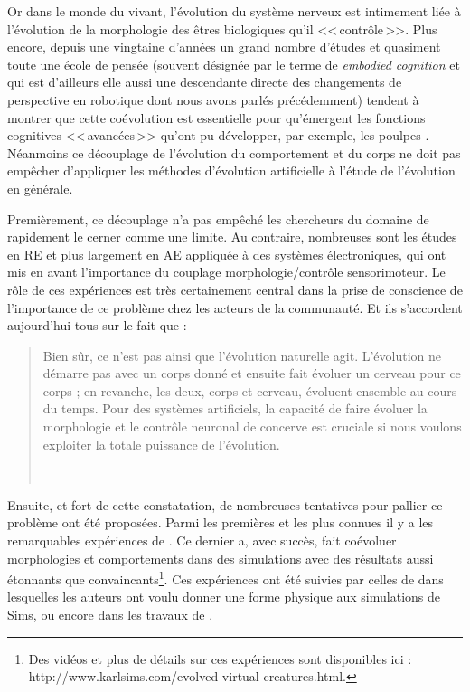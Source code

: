Or dans le monde du vivant, l'évolution du système nerveux est intimement liée à l'évolution de la morphologie des êtres biologiques qu'il <<\,contrôle\,>>. Plus encore, depuis une vingtaine d'années un grand nombre d'études et quasiment toute une école de pensée (souvent désignée par le terme de \emph{embodied cognition} et qui est d'ailleurs elle aussi une descendante directe des changements de perspective en robotique dont nous avons parlés précédemment) tendent à montrer que cette coévolution est essentielle pour qu'émergent les fonctions cognitives <<\,avancées\,>> qu'ont pu développer, par exemple, les poulpes \citep{pfeifer2006howthebodyshapesthewaywethink}. Néanmoins ce découplage de l'évolution du comportement et du corps ne doit pas empêcher d'appliquer les méthodes d'évolution artificielle à l'étude de l'évolution en générale.

Premièrement, ce découplage n'a pas empêché les chercheurs du domaine de rapidement le cerner comme une limite. Au contraire, nombreuses sont les études en RE et plus largement en AE appliquée à des systèmes électroniques, qui ont mis en avant l'importance du couplage morphologie/contrôle sensorimoteur. Le rôle de ces expériences est très certainement central dans la prise de conscience de l'importance de ce problème chez les acteurs de la communauté. Et ils s'accordent aujourd'hui tous sur le fait que :

\begin{quotation}

   Bien sûr, ce n'est pas ainsi que l'évolution naturelle agit. L'évolution ne démarre pas avec un corps donné et ensuite fait évoluer un cerveau pour ce corps ; en revanche, les deux, corps et cerveau, évoluent ensemble au cours du temps. Pour des systèmes artificiels, la capacité de faire évoluer la morphologie et le contrôle neuronal de concerve est cruciale si nous voulons exploiter la totale puissance de l'évolution.

   \\\citep[p. 193]{pfeifer2006howthebodyshapesthewaywethink}

\end{quotation}

Ensuite, et fort de cette constatation, de nombreuses tentatives pour pallier ce problème ont été proposées. Parmi les premières et les plus connues il y a les remarquables expériences de \cite{sims1994evolving3dmorphologyandbehaviorbycompetition}. Ce dernier a, avec succès, fait coévoluer morphologies et comportements dans des simulations avec des résultats aussi étonnants que convaincants\footnote{Des vidéos et plus de détails sur ces expériences sont disponibles ici : http://www.karlsims.com/evolved-virtual-creatures.html.}. Ces expériences ont été suivies par celles de \cite{pollack2000thegolemproject} dans lesquelles les auteurs ont voulu donner une forme physique aux simulations de Sims, ou encore dans les travaux de \citet[ch. 6]{pfeifer2006howthebodyshapesthewaywethink}.

